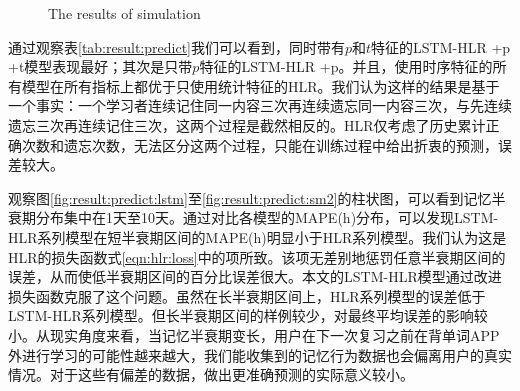 \begin{figure}[htbp]
    \begin{minipage}{\textwidth}
    \centering
    \subfigure{\label{fig:result:predict:lstm}}\addtocounter{subfigure}{-2}
    \hspace{2em}
    \subfigure{\label{fig:result:predict:lstm_i}}\addtocounter{subfigure}{-2}
    \end{minipage}
    \centering
    \begin{minipage}{\textwidth}
    \centering
    \subfigure{\label{fig:result:predict:lstm_p}}\addtocounter{subfigure}{-2}
    \hspace{2em}
    \subfigure{\label{fig:result:predict:lstm_p_i}}\addtocounter{subfigure}{-2}
    \end{minipage}
    \centering
    \begin{minipage}{\textwidth}
    \centering
    \subfigure{\label{fig:result:predict:hlr_l}}\addtocounter{subfigure}{-2}
    \hspace{2em}
    \subfigure{\label{fig:result:predict:sm2}}\addtocounter{subfigure}{-2}
    \end{minipage}
    \vspace{0.2em}
    \caption{The results of simulation}
    \label{fig:result:predict}
\end{figure}

通过观察表\ref{tab:result:predict}我们可以看到，同时带有$p$和$t$特征的LSTM-HLR +p +t模型表现最好；其次是只带$p$特征的LSTM-HLR +p。并且，使用时序特征的所有模型在所有指标上都优于只使用统计特征的HLR。我们认为这样的结果是基于一个事实：一个学习者连续记住同一内容三次再连续遗忘同一内容三次，与先连续遗忘三次再连续记住三次，这两个过程是截然相反的。HLR仅考虑了历史累计正确次数和遗忘次数，无法区分这两个过程，只能在训练过程中给出折衷的预测，误差较大。

观察图\ref{fig:result:predict:lstm}至\ref{fig:result:predict:sm2}的柱状图，可以看到记忆半衰期分布集中在1天至10天。通过对比各模型的MAPE(h)分布，可以发现LSTM-HLR系列模型在短半衰期区间的MAPE(h)明显小于HLR系列模型。我们认为这是HLR的损失函数式\ref{eqn:hlr:loss}中的项所致。该项无差别地惩罚任意半衰期区间的误差，从而使低半衰期区间的百分比误差很大。本文的LSTM-HLR模型通过改进损失函数克服了这个问题。虽然在长半衰期区间上，HLR系列模型的误差低于LSTM-HLR系列模型。但长半衰期区间的样例较少，对最终平均误差的影响较小。从现实角度来看，当记忆半衰期变长，用户在下一次复习之前在背单词APP外进行学习的可能性越来越大，我们能收集到的记忆行为数据也会偏离用户的真实情况。对于这些有偏差的数据，做出更准确预测的实际意义较小。

